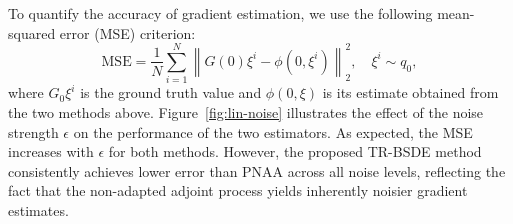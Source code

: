 \documentclass[letterpaper, 10 pt, conference]{ieeeconf}  %
\begin{document}
To quantify the accuracy of gradient estimation, we use the following mean-squared error (MSE) criterion:
\begin{equation}
    \text{MSE} = \frac{1}{N} \sum_{i=1}^N \left\| G(0)\xi^i - \phi(0,\xi^i)\right\|^2_2,\quad \xi^i \sim q_0,
\end{equation}
where $G_0\xi^i$ is the ground truth value and $\phi(0,\xi)$ is its estimate obtained from the two methods above. 
Figure~\ref{fig:lin-noise} illustrates the effect of the noise strength $\epsilon$ on the performance of the two estimators. As expected, the MSE increases with $\epsilon$ for both methods. However, the proposed TR-BSDE method consistently achieves lower error than PNAA across all noise levels, reflecting the fact that the non-adapted adjoint process yields inherently noisier gradient estimates. 
\end{document}
